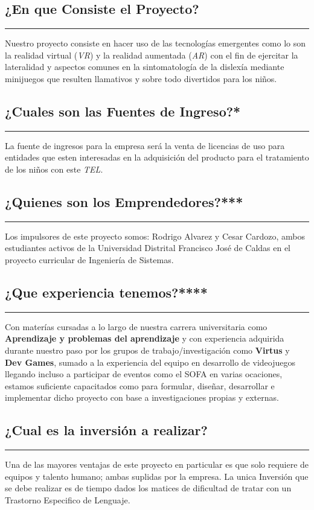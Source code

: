 \documentclass[12pt,letterpaper]{article}
\begin{document}
\subsection{¿En que Consiste el Proyecto?}
\rule{150mm}{0.1mm} 
Nuestro proyecto consiste en hacer uso de las tecnologías emergentes como lo son la realidad virtual (\textit{VR}) y la realidad aumentada (\textit{AR}) con el fin de ejercitar la lateralidad y aspectos comunes en la sintomatología de la dislexía mediante minijuegos que resulten llamativos y sobre todo divertidos para los niños.\\

\subsection{¿Cuales son las Fuentes de Ingreso?*}
\rule{150mm}{0.1mm} 
La fuente de ingresos para la empresa será la venta de licencias de uso para entidades que esten interesadas en la adquisición del producto para el tratamiento de los  niños con este \textit{TEL}.\\

\subsection{¿Quienes son los Emprendedores?***}
\rule{150mm}{0.1mm} 
Los impulsores de este proyecto somos:
Rodrigo Alvarez y Cesar Cardozo, ambos estudiantes activos de la Universidad Distrital Francisco José de Caldas en el proyecto curricular de Ingeniería de Sistemas.\\

\subsection{¿Que experiencia tenemos?****}
\rule{150mm}{0.1mm} 
Con materías cursadas a lo largo de nuestra carrera universitaria como \textbf{Aprendizaje y problemas del aprendizaje} y con experiencia adquirida durante nuestro paso por los grupos de trabajo/investigación como \textbf{Virtus} y \textbf{Dev Games}, sumado a la experiencia del equipo en desarrollo de videojuegos llegando incluso a participar de eventos como el SOFA en varias ocaciones, estamos suficiente capacitados como para formular, diseñar, desarrollar e implementar dicho proyecto con base a investigaciones propias y externas.\\

\subsection{¿Cual es la inversión a realizar?}
\rule{150mm}{0.1mm} 
Una de las mayores ventajas de este proyecto en particular es que solo requiere de equipos y talento humano; ambas suplidas por la empresa.
La unica Inversión que se debe realizar es de tiempo dados los matices de dificultad de tratar con un Trastorno Especifico de Lenguaje.
\end{document}
